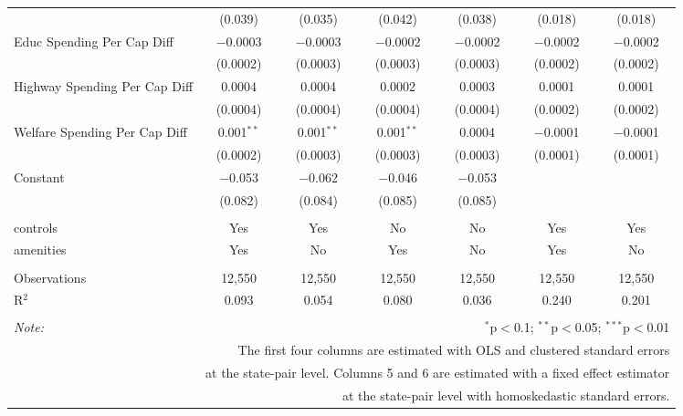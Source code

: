 \begin{table}[!htbp]
\begin{tabular}{@{\extracolsep{5pt}}lcccccc}
  & (0.039) & (0.035) & (0.042) & (0.038) & (0.018) & (0.018) \\ 
  Educ Spending Per Cap Diff & $-$0.0003 & $-$0.0003 & $-$0.0002 & $-$0.0002 & $-$0.0002 & $-$0.0002 \\ 
  & (0.0002) & (0.0003) & (0.0003) & (0.0003) & (0.0002) & (0.0002) \\ 
  Highway Spending Per Cap Diff & 0.0004 & 0.0004 & 0.0002 & 0.0003 & 0.0001 & 0.0001 \\ 
  & (0.0004) & (0.0004) & (0.0004) & (0.0004) & (0.0002) & (0.0002) \\ 
  Welfare Spending Per Cap Diff & 0.001$^{**}$ & 0.001$^{**}$ & 0.001$^{**}$ & 0.0004 & $-$0.0001 & $-$0.0001 \\ 
  & (0.0002) & (0.0003) & (0.0003) & (0.0003) & (0.0001) & (0.0001) \\ 
  Constant & $-$0.053 & $-$0.062 & $-$0.046 & $-$0.053 &  &  \\ 
  & (0.082) & (0.084) & (0.085) & (0.085) &  &  \\ 
 \hline \\[-1.8ex] 
controls & Yes & Yes & No & No & Yes & Yes \\ 
amenities & Yes & No & Yes & No & Yes & No \\ 
\hline \\[-1.8ex] 
Observations & 12,550 & 12,550 & 12,550 & 12,550 & 12,550 & 12,550 \\ 
R$^{2}$ & 0.093 & 0.054 & 0.080 & 0.036 & 0.240 & 0.201 \\ 
\hline 
\hline \\[-1.8ex] 
\textit{Note:}  & \multicolumn{6}{r}{$^{*}$p$<$0.1; $^{**}$p$<$0.05; $^{***}$p$<$0.01} \\ 
 & \multicolumn{6}{r}{The first four columns are estimated with OLS and clustered standard errors} \\ 
 & \multicolumn{6}{r}{at the state-pair level. Columns 5 and 6 are estimated with a fixed effect estimator} \\ 
 & \multicolumn{6}{r}{at the state-pair level with homoskedastic standard errors.} \\ 
\end{tabular} 
\end{table} 
